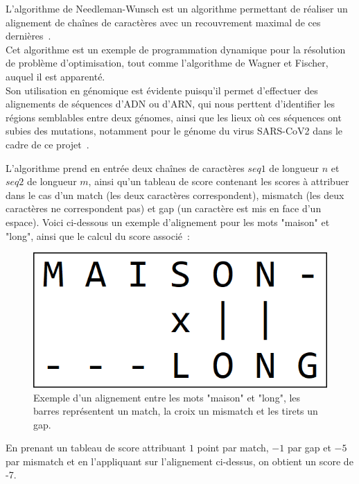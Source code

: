 \documentclass[12pt]{article}
\begin{document}
L'algorithme de Needleman-Wunsch est un algorithme permettant de réaliser un alignement de chaînes de caractères avec un recouvrement maximal de ces dernières~\cite{nwcours}. \\
Cet algorithme est un exemple de programmation dynamique pour la résolution de problème d'optimisation, tout comme l'algorithme de Wagner et Fischer, auquel il est apparenté.\\
Son utilisation en génomique est évidente puisqu'il permet d'effectuer des alignements de séquences d'ADN ou d'ARN, qui nous perttent d'identifier les régions semblables entre deux génomes, ainsi que les lieux où ces séquences ont subies des mutations, notamment pour le génome du virus SARS-CoV2 dans le cadre de ce projet~\cite{alignement}.

L'algorithme prend en entrée deux chaînes de caractères $seq1$ de longueur $n$ et $seq2$ de longueur $m$, ainsi qu'un tableau de score contenant les scores à attribuer dans le cas d'un match (les deux caractères correspondent), mismatch (les deux caractères ne correspondent pas) et gap (un caractère est mis en face d'un espace). Voici ci-dessous un exemple d'alignement pour les mots "maison" et "long", ainsi que le calcul du score associé~:\\

\begin{figure}[!h]
    \centering
    \includegraphics[scale = 0.55]{Images/Needleman/exemple alignement.png}
    \caption{Exemple d'un alignement entre les mots "maison" et "long", les barres représentent un match, la croix un mismatch et les tirets un gap.}
    \label{fig:Exemple d'un alignement entre les mots "maison" et "long", les barres représentent un match, la croix un mismatch et les tirets un gap.}
\end{figure}

En prenant un tableau de score attribuant $1$ point par match, $-1$ par gap et $-5$ par mismatch et en l'appliquant sur l'alignement ci-dessus, on obtient un score de -7.\\
\end{document}
